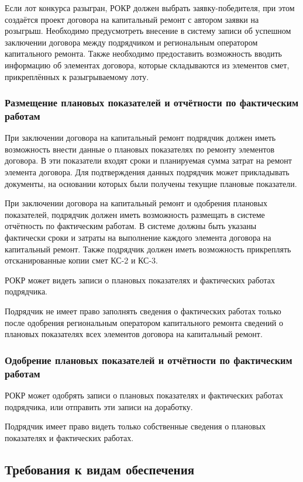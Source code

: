 Если лот конкурса разыгран, РОКР должен выбрать заявку-победителя, при этом создаётся проект договора на капитальный ремонт с автором заявки на розыгрыш.
Необходимо предусмотреть внесение в систему записи об успешном заключении договора между подрядчиком и региональным оператором капитального ремонта.
Также необходимо предоставить возможность вводить информацию об элементах договора, которые складываются из элементов смет, прикреплённых к разыгрываемому лоту.

\subsubsection{Размещение плановых показателей и отчётности по фактическим работам}

При заключении договора на капитальный ремонт подрядчик должен иметь возможность внести данные о плановых показателях по ремонту элементов договора.
В эти показатели входят сроки и планируемая сумма затрат на ремонт элемента договора.
Для подтверждения данных подрядчик может прикладывать документы, на основании которых были получены текущие плановые показатели.

При заключении договора на капитальный ремонт и одобрения плановых показателей, подрядчик должен иметь возможность размещать в системе отчётность по фактическим работам.
В системе должны быть указаны фактически сроки и затраты на выполнение каждого элемента договора на капитальный ремонт.
Также подрядчик должен иметь возможность прикреплять отсканированные копии смет КС-2 и КС-3.

РОКР может видеть записи о плановых показателях и фактических работах подрядчика.

Подрядчик не имеет право заполнять сведения о фактических работах только после одобрения региональным оператором капитального ремонта сведений о плановых показателях всех элементов договора на капитальный ремонт.

\subsubsection{Одобрение плановых показателей и отчётности по фактическим работам}

РОКР может одобрять записи о плановых показателях и фактических работах подрядчика, или отправить эти записи на доработку.

Подрядчик имеет право видеть только собственные сведения о плановых показателях и фактических работах.

\subsection{Требования к видам обеспечения}


